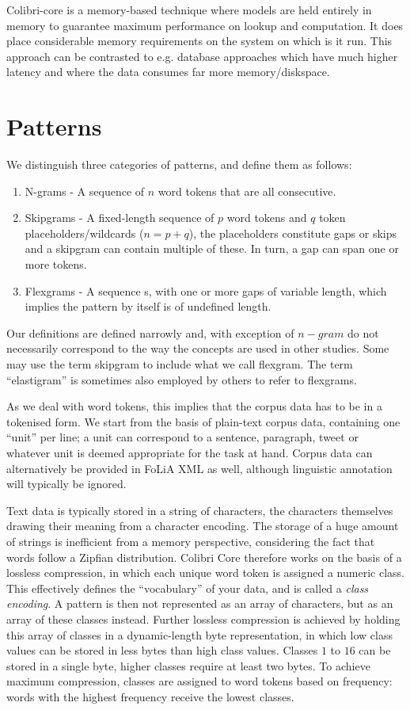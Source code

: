 Colibri-core is a memory-based technique where models are held entirely in
memory to guarantee maximum performance on lookup and computation. It does
place considerable memory requirements on the system on which is it run. This
approach can be contrasted to e.g. database approaches which have much higher
latency and where the data consumes far more memory/diskspace.

\section{Patterns}

We distinguish three categories of patterns, and define them as follows:

\begin{enumerate}
    \item N-grams - A sequence of $n$ word tokens that are all consecutive.
    \item Skipgrams - A fixed-length sequence of $p$ word tokens and $q$ token placeholders/wildcards ($n=p+q$), the placeholders constitute gaps or skips and a skipgram can contain multiple of these. In turn, a gap can span one or more tokens. 
    \item Flexgrams - A sequence s, with one or more gaps of variable length, which implies the pattern by itself is of undefined length.
\end{enumerate}

Our definitions are defined narrowly and, with exception of $n-gram$ do not
necessarily correspond to the way the concepts are used in other studies. Some
may use the term skipgram to include what we call flexgram.  The term
``elastigram'' is sometimes also employed by others to refer to flexgrams. 

As we deal with word tokens, this implies that the corpus data has to be in a
tokenised form. We start from the basis of plain-text corpus data, containing one
``unit'' per line; a unit can correspond to a sentence, paragraph, tweet
or whatever unit is deemed appropriate for the task at hand. Corpus data can
alternatively be provided in FoLiA XML \cite{TODO} as well, although linguistic
annotation will typically be ignored.

Text data is typically stored in a string of characters, the
characters themselves drawing their meaning from a character encoding. The
storage of a huge amount of strings is inefficient from a memory perspective,
considering the fact that words follow a Zipfian distribution. Colibri Core
therefore works on the basis of a lossless compression, in which each unique
word token is assigned a numeric class. This effectively defines the
``vocabulary'' of your data, and is called a \emph{class encoding}. A pattern
is then not represented as an array of characters, but as an array of these
classes instead. Further lossless compression is achieved by holding this array
of classes in a dynamic-length byte representation, in which low class values
can be stored in less bytes than high class values. Classes $1$ to $16$ can be
stored in a single byte, higher classes require at least two bytes. To achieve
maximum compression, classes are assigned to word tokens based on frequency:
words with the highest frequency receive the lowest classes.

